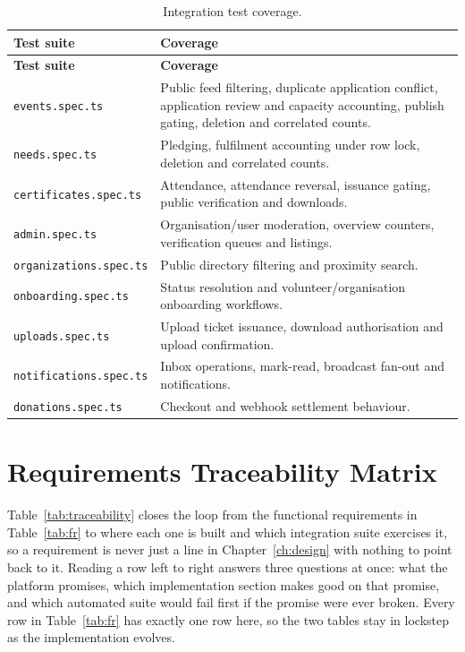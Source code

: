 \begin{longtable}{|p{}|p{}|}
\caption{Integration test coverage.}\label{tab:tests}\\\hline
\textbf{Test suite} & \textbf{Coverage}\\\hline
\endfirsthead
\hline
\textbf{Test suite} & \textbf{Coverage}\\\hline
\endhead
\texttt{events.spec.ts} & Public feed filtering, duplicate application conflict, application review and capacity accounting, publish gating, deletion and correlated counts.\\\hline
\texttt{needs.spec.ts} & Pledging, fulfilment accounting under row lock, deletion and correlated counts.\\\hline
\texttt{certificates.spec.ts} & Attendance, attendance reversal, issuance gating, public verification and downloads.\\\hline
\texttt{admin.spec.ts} & Organisation/user moderation, overview counters, verification queues and listings.\\\hline
\texttt{organizations.spec.ts} & Public directory filtering and proximity search.\\\hline
\texttt{onboarding.spec.ts} & Status resolution and volunteer/organisation onboarding workflows.\\\hline
\texttt{uploads.spec.ts} & Upload ticket issuance, download authorisation and upload confirmation.\\\hline
\texttt{notifications.spec.ts} & Inbox operations, mark-read, broadcast fan-out and notifications.\\\hline
\texttt{donations.spec.ts} & Checkout and webhook settlement behaviour.\\\hline

\end{longtable}

\clearpage
\section{Requirements Traceability Matrix}
\label{sec:traceability}
Table~\ref{tab:traceability} closes the loop from the functional requirements in Table~\ref{tab:fr} to where each one is built and which integration suite exercises it, so a requirement is never just a line in Chapter~\ref{ch:design} with nothing to point back to it. Reading a row left to right answers three questions at once: what the platform promises, which implementation section makes good on that promise, and which automated suite would fail first if the promise were ever broken. Every row in Table~\ref{tab:fr} has exactly one row here, so the two tables stay in lockstep as the implementation evolves.

